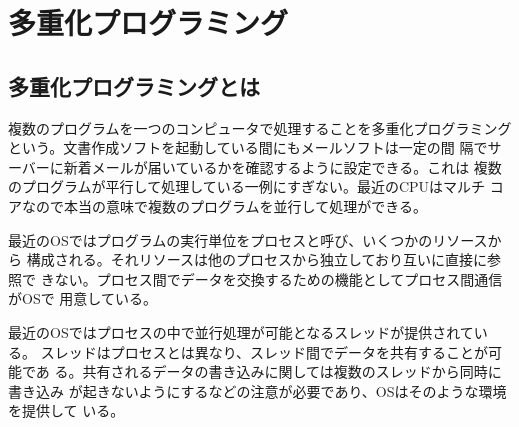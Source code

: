 \chapter{多重化プログラミング}
\section{多重化プログラミングとは}
複数のプログラムを一つのコンピュータで処理することを多重化プログラミング
という。文書作成ソフトを起動している間にもメールソフトは一定の間
隔でサーバーに新着メールが届いているかを確認するように設定できる。これは
複数のプログラムが平行して処理している一例にすぎない。最近のCPUはマルチ
コアなので本当の意味で複数のプログラムを並行して処理ができる。

最近のOSではプログラムの実行単位をプロセスと呼び、いくつかのリソースから
構成される。それリソースは他のプロセスから独立しており互いに直接に参照で
きない。プロセス間でデータを交換するための機能としてプロセス間通信がOSで
用意している。

最近のOSではプロセスの中で並行処理が可能となるスレッドが提供されている。
スレッドはプロセスとは異なり、スレッド間でデータを共有することが可能であ
る。共有されるデータの書き込みに関しては複数のスレッドから同時に書き込み
が起きないようにするなどの注意が必要であり、OSはそのような環境を提供して
いる。
